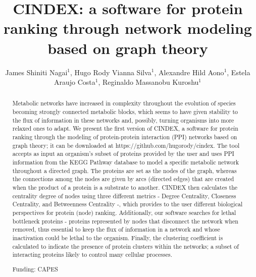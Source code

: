 \documentclass[twoside]{article}
\title{\vspace{-15mm}\fontsize{24pt}{10pt}\selectfont\textbf{CINDEX: a software for protein ranking through network modeling based on graph theory}} %
\author{James Shiniti Nagai$^1$, Hugo Rody Vianna Silva$^1$, Alexandre Hild Aono$^1$, Estela Araujo Costa$^1$, Reginaldo Massanobu Kuroshu$^1$}
\affil{1 UNIFESP\\ }
\date{}
\begin{document}
\maketitle %

\thispagestyle{fancy} %


\begin{abstract}
Metabolic networks have increased in complexity throughout the evolution of species becoming strongly connected metabolic blocks, which seems to have given stability to the flux of information in these networks and, possibly, turning organisms into more relaxed ones to adapt. We present the first version of CINDEX, a software for protein ranking through the modeling of protein-protein interaction (PPI) networks based on graph theory; it can be downloaded at https://github.com/hugorody/cindex. The tool accepts as input an organism's subset of proteins provided by the user and uses PPI information from the KEGG Pathway database to model a specific metabolic network throughout a directed graph. The proteins are set as the nodes of the graph, whereas the connections among the nodes are given by arcs (directed edges) that are created when the product of a protein is a substrate to another. CINDEX then calculates the centrality degree of nodes using three different metrics - Degree Centrality, Closeness Centrality, and Betweenness Centrality -, which provides to the user different biological perspectives for protein (node) ranking. Additionally, our software searches for lethal bottleneck proteins - proteins represented by nodes that disconnect the network when removed, thus essential to keep the flux of information in a network and whose inactivation could be lethal to the organism. Finally, the clustering coefficient is calculated to indicate the presence of protein clusters within the networks; a subset of interacting proteins likely to control many cellular processes.

Funding: CAPES
\end{abstract}
\end{document}
